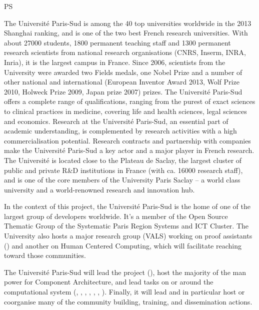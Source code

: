\begin{sitedescription}{PS} \label{desc:ParisSud}

The Université Paris-Sud is among the 40 top universities worldwide in the
2013 Shanghai ranking, and is one of the two best French research
universities. With about 27000 students, 1800 permanent teaching staff
and 1300 permanent research scientists from national research
organisations (CNRS, Inserm, INRA, Inria), it is the largest campus in
France. Since 2006, scientists from the University were awarded two
Fields medals, one Nobel Prize and a number of other national and international
(European Inventor Award 2013, Wolf Prize 2010, Holweck Prize 2009,
Japan prize 2007) prizes.  The Université Paris-Sud offers a
complete range of qualifications, ranging from the purest of exact
sciences to clinical practices in medicine, covering life and health
sciences, legal sciences and economics. Research at the Université
Paris-Sud, an essential part of academic understanding, is
complemented by research activities with a high commercialisation
potential. Research contracts and partnership with companies make the
Université Paris-Sud a key actor and a major player in French
research.  The Université is located close to the Plateau de Saclay,
the largest cluster of public and private R\&D institutions in France
(with ca. 16000 research staff), and is one of the core members of the
University Paris Saclay – a world class university and a
world-renowned research and innovation hub.

In the context of this project, the Université Paris-Sud is the
home of one of the largest group of \Sage developers worldwide.
It's a member of the Open Source Thematic Group of the Systematic
Paris Region Systems and ICT Cluster. The University also hosts a
major research group (VALS) working on proof assistants () and
another on Human Centered Computing, which will facilitate reaching
toward those communities.

The Université Paris-Sud will lead the project (),
host the majority of the man power for 
Component Architecture, and lead tasks on or around the \Sage
computational system (,
,
, ,
, ,
). Finally, it will lead  and in
particular host or coorganise many of the community building,
training, and dissemination actions.


\end{sitedescription}
